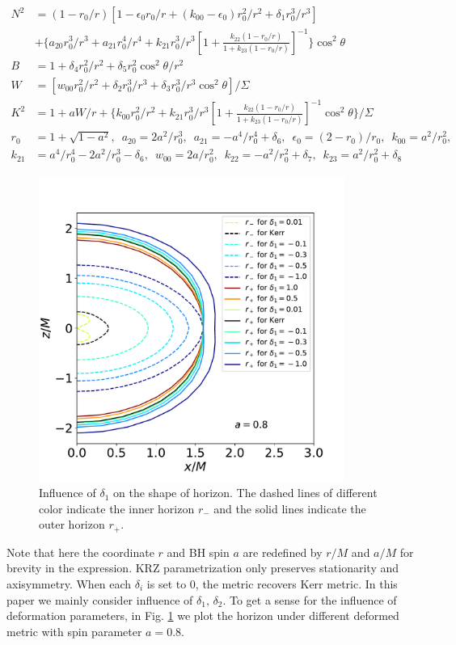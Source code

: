 \documentclass{article}
\begin{document}
\begin{equation}
\begin{aligned}
N^2&=(1-r_0/r)[ 1-\epsilon_0r_0/r +(k_{00}-\epsilon_0)r_0^2/r^2 +\delta_1 r_0^3/r^3 ] \\
&+ \{ a_{20} r_0^3/r^3 +a_{21} r_0^4/r^4 + k_{21}r_0^3/r^3[ 1+\frac{k_{22}(1-r_0/r) }{1+k_{23}(1-r_0/r)} ]^{-1}   \} \cos^2\theta   \\
B&=1+\delta_4r_0^2 /r^2 +\delta_5r_0^2 \cos^2\theta /r^2\\
W&=[w_{00}r_0^2 /r^2 +\delta_2 r_0^3/r^3 +\delta_3 r_0^3/r^3 \cos^2\theta ]/\Sigma\\
K^2&= 1+aW/r+\{k_{00}r_0^2/r^2 +k_{21}r_0^3/r^3 [ 1+\frac{k_{22}(1-r_0/r) }{1+k_{23}(1-r_0/r)} ]^{-1} \cos^2\theta \}/\Sigma\\
r_0&=1+\sqrt{1-a^2},\,\,\, a_{20}=2a^2/r_0^3,\,\,\, a_{21}=-a^4/r_0^4 +\delta_6 ,\,\,\, \epsilon_0=(2-r_0)/r_0,\,\,\, k_{00}=a^2/r_0^2,\\
 k_{21}&=a^4/r_0^4 -2a^2/r_0^3-\delta_6,\,\,\, w_{00}=2a/r_0^2,\,\,\, k_{22}=-a^2/r_0^2 +\delta_7,\,\,\,  k_{23} = a^2/r_0^2 +\delta_8
\end{aligned}
\end{equation}
\begin{figure}[!ht]
	\centering
	\includegraphics[width=10cm]{horizon.pdf}
	
	\caption{Influence of $\delta_1$ on the shape of horizon. The dashed lines of different color indicate the inner horizon $r_-$ and the solid lines indicate the outer horizon $r_+$. }
	\label{hori}
\end{figure}	
Note that here the coordinate $r$ and BH spin $a$ are redefined by $r/M$ and $a/M$ for brevity in the expression. KRZ parametrization only preserves stationarity and axisymmetry. When each $\delta_i$ is set to 0, the metric recovers Kerr metric. In this paper we mainly consider influence of $\delta_1, \, \delta_2$. To get a sense for the influence of deformation parameters, in Fig. \ref{hori} we plot the horizon under different deformed metric with spin parameter $a=0.8$.
\end{document}
